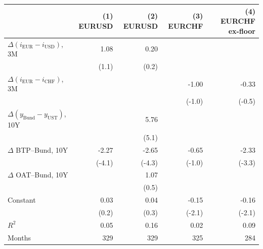\begin{tabular}{@{}lrrrr@{}}
\toprule
 & (1) EURUSD & (2) EURUSD & (3) EURCHF & (4) EURCHF ex-floor \\
\midrule
$\Delta(i_{\mathrm{EUR}} - i_{\mathrm{USD}})$, 3M & 1.08 & 0.20 &  &  \\
 & (1.1) & (0.2) &  &  \\[2pt]
$\Delta(i_{\mathrm{EUR}} - i_{\mathrm{CHF}})$, 3M &  &  & -1.00 & -0.33 \\
 &  &  & (-1.0) & (-0.5) \\[2pt]
$\Delta(y_{\mathrm{Bund}} - y_{\mathrm{UST}})$, 10Y &  & 5.76 &  &  \\
 &  & (5.1) &  &  \\[2pt]
$\Delta$ BTP--Bund, 10Y & -2.27 & -2.65 & -0.65 & -2.33 \\
 & (-4.1) & (-4.3) & (-1.0) & (-3.3) \\[2pt]
$\Delta$ OAT--Bund, 10Y &  & 1.07 &  &  \\
 &  & (0.5) &  &  \\[2pt]
Constant & 0.03 & 0.04 & -0.15 & -0.16 \\
 & (0.2) & (0.3) & (-2.1) & (-2.1) \\[2pt]
\midrule
$R^2$ & 0.05 & 0.16 & 0.02 & 0.09 \\
Months & 329 & 329 & 325 & 284 \\
\bottomrule
\end{tabular}
